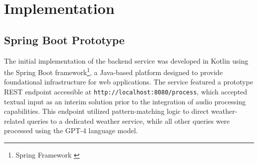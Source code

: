 \renewcommand*\chapterpagestyle{scrheadings}
\chapter{Implementation}

\section{Spring Boot Prototype}
The initial implementation of the backend service was developed in Kotlin using the Spring Boot framework\footnote{Spring Framework \cite{spring}}, a Java-based platform designed to provide foundational infrastructure for web applications. The service featured a prototype REST endpoint accessible at \texttt{http://localhost:8080/process}, which accepted textual input as an interim solution prior to the integration of audio processing capabilities. This endpoint utilized pattern-matching logic to direct weather-related queries to a dedicated weather service, while all other queries were processed using the GPT-4 language model.

